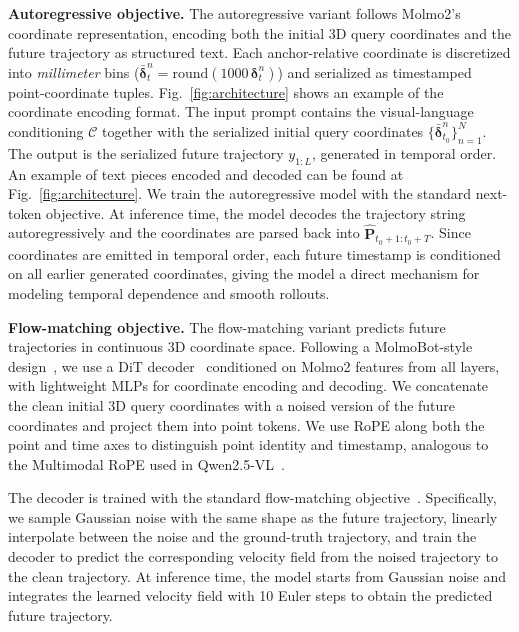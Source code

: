 \noindent\textbf{Autoregressive objective.}
The autoregressive variant follows Molmo2's coordinate representation, encoding both the initial 3D query coordinates and the future trajectory as structured text. Each anchor-relative coordinate is discretized into \textit{millimeter} bins
($\bar{\boldsymbol{\delta}}_{t}^{n}
=
\mathrm{round}\!\left(
1000\,\boldsymbol{\delta}_{t}^{n}
\right)$)
and serialized as timestamped point-coordinate tuples. Fig.~\ref{fig:architecture} shows an example of the coordinate encoding format.
The input prompt contains the visual-language conditioning $\mathcal{C}$ together with the serialized initial query coordinates $\{\bar{\boldsymbol{\delta}}_{t_0}^{n}\}_{n=1}^{N}$. The output is the serialized future trajectory $y_{1:L}$, generated in temporal order. An example of text pieces encoded and decoded can be found at Fig.~\ref{fig:architecture}.
We train the autoregressive model with the standard next-token objective.
At inference time, the model decodes the trajectory string autoregressively and the coordinates are parsed back into $\hat{\mathbf{P}}_{t_0+1:t_0+T}$. Since coordinates are emitted in temporal order, each future timestamp is conditioned on all earlier generated coordinates, giving the model a direct mechanism for modeling temporal dependence and smooth rollouts. 



\noindent\textbf{Flow-matching objective.}
The flow-matching variant predicts future trajectories in continuous 3D coordinate space. Following a MolmoBot-style design~\cite{deshpande2026molmobot}, we use a DiT decoder~\cite{peebles2023dit} conditioned on Molmo2 features from all layers, with lightweight MLPs for coordinate encoding and decoding. We concatenate the clean initial 3D query coordinates with a noised version of the future coordinates and project them into point tokens. We use RoPE along both the point and time axes to distinguish point identity and timestamp, analogous to the Multimodal RoPE used in Qwen2.5-VL~\cite{su2023roformerenhancedtransformerrotary,bai2025qwen25vl}.

The decoder is trained with the standard flow-matching objective~\cite{lipman2023flowmatching}. Specifically, we sample Gaussian noise with the same shape as the future trajectory, linearly interpolate between the noise and the ground-truth trajectory, and train the decoder to predict the corresponding velocity field from the noised trajectory to the clean trajectory. At inference time, the model starts from Gaussian noise and integrates the learned velocity field with 10 Euler steps to obtain the predicted future trajectory.



